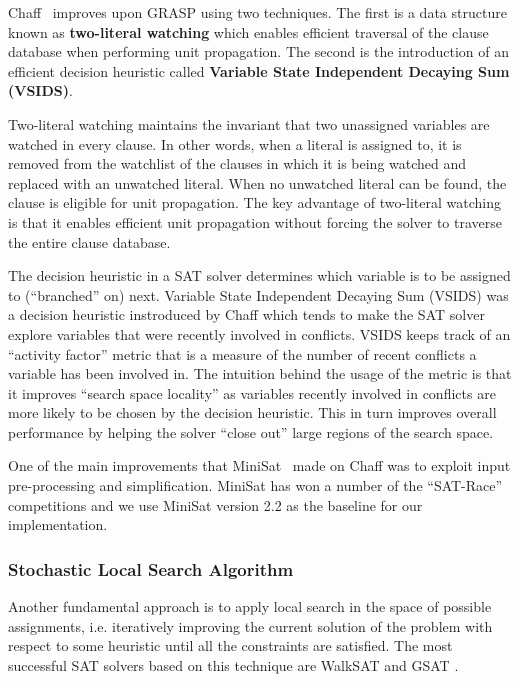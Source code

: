 \documentclass[letterpaper, compsoc, conference]{IEEEtran}
\begin{document}
Chaff~\cite{Moskewicz2001Chaff} improves upon GRASP using two techniques.  The
first is a data structure known as \textbf{two-literal watching} which enables
efficient traversal of the clause database when performing unit propagation.
The second is the introduction of an efficient decision heuristic called
\textbf{Variable State Independent Decaying Sum (VSIDS)}.

Two-literal watching maintains the invariant that two unassigned variables are
watched in every clause. In other words, when a literal is assigned to, it is
removed from the watchlist of the clauses in which it is being watched and
replaced with an unwatched literal. When no unwatched literal can be found, the
clause is eligible for unit propagation. The key advantage of two-literal
watching is that it enables efficient unit propagation without forcing the
solver to traverse the entire clause database.

The decision heuristic in a SAT solver determines which variable is to be
assigned to (``branched'' on) next.  Variable State Independent Decaying Sum
(VSIDS) was a decision heuristic instroduced by Chaff which tends to make the
SAT solver explore variables that were recently involved in conflicts. VSIDS
keeps track of an ``activity factor'' metric that is a measure of the number of
recent conflicts a variable has been involved in.  The intuition behind the
usage of the metric is that it improves ``search space locality'' as variables
recently involved in conflicts are more likely to be chosen by the decision
heuristic.  This in turn improves overall performance by helping the solver
``close out'' large regions of the search space.

One of the main improvements that MiniSat~\cite{MiniSat} made on Chaff was to
exploit input pre-processing and simplification. MiniSat has won a number of
the ``SAT-Race'' competitions and we use MiniSat version 2.2 as the baseline
for our implementation.

\subsubsection{Stochastic Local Search Algorithm}
Another fundamental approach is to apply local search in the space of possible
assignments, i.e. iteratively improving the current solution of the
problem with respect to some heuristic until all the constraints are satisfied.
The most successful SAT solvers based on this technique are WalkSAT
\cite{Selman95localsearch} and GSAT \cite{Selman1992}.
\end{document}
